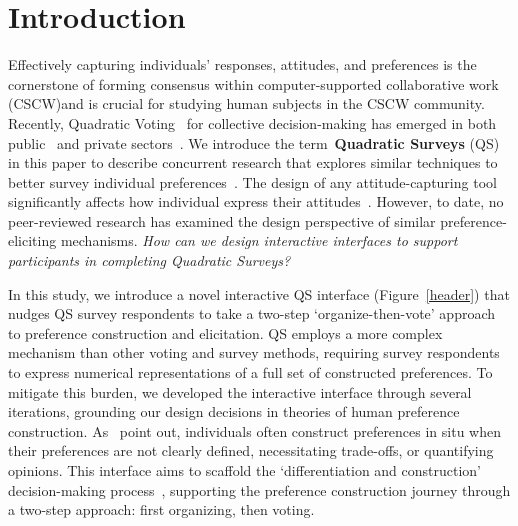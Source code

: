 \section{Introduction}
Effectively capturing individuals' responses, attitudes, and preferences is the cornerstone of forming consensus within computer-supported collaborative work (CSCW)and is crucial for studying human subjects in the CSCW community. Recently, Quadratic Voting~\cite{posner2018radical} for collective decision-making has emerged in both public~\cite{ColoradoTriedNew, QuadraticVotingColorado, teamTaiwanDigitalMinister} and private sectors~\cite{Gov4gitDecentralizedPlatform2023}. We introduce the term~\textbf{Quadratic Surveys} (QS) in this paper to describe concurrent research that explores similar techniques to better survey individual preferences~\cite{quarfoot2017quadratic, chengCanShowWhat2021}. The design of any attitude-capturing tool significantly affects how individual express their attitudes~\cite{engstrom2020politics, weijtersEffectRatingScale2010, kierujVariationsResponseStyle2010, toepoelSmileysStarsHearts2019, farzandAestheticsEvaluatingResponse2024, xiaoTellMeYourself2020, pielotDidYouMisclick2024}. However, to date, no peer-reviewed research has examined the design perspective of similar preference-eliciting mechanisms. \textit{How can we design interactive interfaces to support participants in completing Quadratic Surveys?}

In this study, we introduce a novel interactive QS interface (Figure~\ref{header}) that nudges QS survey respondents to take a two-step `organize-then-vote' approach to preference construction and elicitation. QS employs a more complex mechanism than other voting and survey methods, requiring survey respondents to express numerical representations of a full set of constructed preferences. To mitigate this burden, we developed the interactive interface through several iterations, grounding our design decisions in theories of human preference construction. As~\textcite{lichtensteinConstructionPreference2006} point out, individuals often construct preferences in situ when their preferences are not clearly defined, necessitating trade-offs, or quantifying opinions. This interface aims to scaffold the `differentiation and construction' decision-making process~\textcite{svensonDifferentiationConsolidationTheory1992}, supporting the preference construction journey through a two-step approach: first organizing, then voting.

